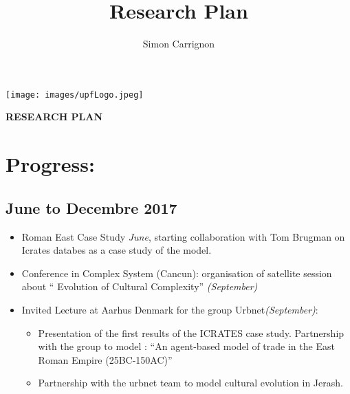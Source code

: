 \documentclass[a4paper]{article}
\title{Research Plan}
\author{Simon Carrignon}
\begin{document}
\vspace{-1cm}
\hspace{-1cm}
\begin{minipage}{.5\textwidth}
    \noindent \texttt{[image: images/upfLogo.jpeg]} 
\end{minipage}
\hfill
\begin{minipage}{.5\textwidth}
    \flushright
    \textbf{ \Large RESEARCH PLAN }
\end{minipage}

\vspace{3cm}

\hspace{-1cm}

\section*{Progress:}

\subsection*{June to Decembre 2017}
	\begin{itemize}
        \item Roman East Case Study \emph{ June}, starting collaboration with Tom Brugman on Icrates databes as a case study of the model.
	    \item Conference in Complex System (Cancun): organisation of satellite session about `` Evolution of Cultural Complexity'' \emph{(September)}
	    \item Invited Lecture at Aarhus Denmark for the group Urbnet\emph{(September)}:
            \begin{itemize}
                \item  Presentation of the first results of the ICRATES case study. Partnership with the group to model : ``An agent-based model of trade in the East Roman Empire (25BC-150AC)''
                \item Partnership with the urbnet team to model cultural evolution in Jerash.
            \end{itemize}
	\end{itemize}
\end{document}
